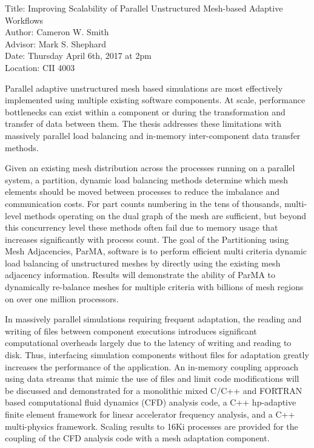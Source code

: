 \noindent Title: Improving Scalability of Parallel Unstructured Mesh-based Adaptive Workflows\\
Author: Cameron W. Smith\\
Advisor: Mark S. Shephard\\
Date: Thursday April 6th, 2017 at 2pm\\
Location: CII 4003

Parallel adaptive unstructured mesh based simulations are most effectively
implemented using multiple existing software components.
At scale, performance bottlenecks can exist within a component or during the
transformation and transfer of data between them.
The thesis addresses these limitations with massively parallel load balancing
and in-memory inter-component data transfer methods.

Given an existing mesh distribution across the processes running on a parallel system,
a partition, dynamic load balancing methods determine which mesh elements should
be moved between processes to reduce the imbalance and communication costs.
For part counts numbering in the tens of thousands, multi-level methods
operating on the dual graph of the mesh are sufficient, but beyond this
concurrency level these methods often fail due to memory usage that increases
significantly with process count.
The goal of the Partitioning using Mesh Adjacencies, ParMA, software is to
perform efficient multi criteria dynamic load balancing of unstructured meshes
by directly using the existing mesh adjacency information.
Results will demonstrate the ability of ParMA to dynamically re-balance meshes
for multiple criteria with billions of mesh regions on over one million
processors.

In massively parallel simulations requiring frequent adaptation, the reading and
writing of files between component executions introduces significant
computational overheads largely due to the latency of writing and reading to disk.
Thus, interfacing simulation components without files for adaptation greatly
increases the performance of the application.
An in-memory coupling approach using data streams that mimic the use of files
and limit code modifications will be discussed and demonstrated for a monolithic
mixed C/C++ and FORTRAN based computational fluid dynamics (CFD) analysis code,
a C++ hp-adaptive finite element framework for linear accelerator frequency
analysis, and a C++ multi-physics framework.
Scaling results to 16Ki processes are provided for the coupling of the CFD
analysis code with a mesh adaptation component.
